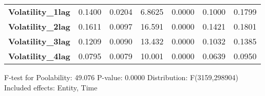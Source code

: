 \begin{center}
\begin{tabular}{lcccccc}
\textbf{Volatility\_1lag}               &       0.1400       &       0.0204       &      6.8625     &      0.0000      &       0.1000      &       0.1799       \\
\textbf{Volatility\_2lag}               &       0.1611       &       0.0097       &      16.591     &      0.0000      &       0.1421      &       0.1801       \\
\textbf{Volatility\_3lag}               &       0.1209       &       0.0090       &      13.432     &      0.0000      &       0.1032      &       0.1385       \\
\textbf{Volatility\_4lag}               &       0.0795       &       0.0079       &      10.001     &      0.0000      &       0.0639      &       0.0950       \\
\bottomrule
\end{tabular}
\end{center}

F-test for Poolability: 49.076 \newline
 P-value: 0.0000 \newline
 Distribution: F(3159,298904) \newline
  \newline
 Included effects: Entity, Time